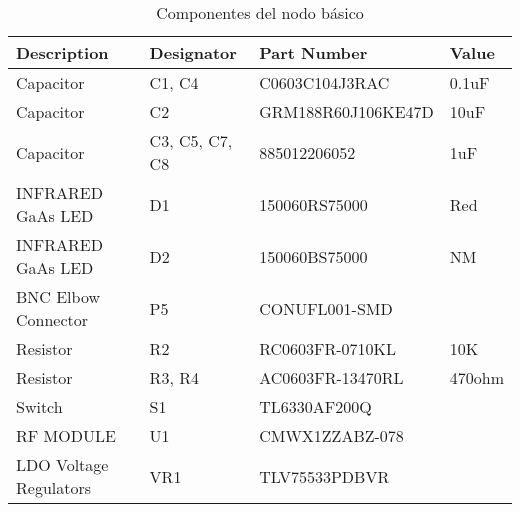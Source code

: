 	
\begin{table}[htb!]

\centering

\begin{tabular}{|l|l|l|l|}
\hline
Description            & Designator     & Part Number        & Value  \\ \hline
Capacitor              & C1, C4         & C0603C104J3RAC     & 0.1uF  \\ \hline
Capacitor              & C2             & GRM188R60J106KE47D & 10uF   \\ \hline
Capacitor              & C3, C5, C7, C8 & 885012206052       & 1uF    \\ \hline
INFRARED GaAs LED      & D1             & 150060RS75000      & Red    \\ \hline
INFRARED GaAs LED      & D2             & 150060BS75000      & NM     \\ \hline
BNC Elbow Connector    & P5             & CONUFL001-SMD      &        \\ \hline
Resistor               & R2             & RC0603FR-0710KL    & 10K    \\ \hline
Resistor               & R3, R4         & AC0603FR-13470RL   & 470ohm \\ \hline
Switch                 & S1             & TL6330AF200Q       &        \\ \hline
RF MODULE              & U1             & CMWX1ZZABZ-078     &        \\ \hline
LDO Voltage Regulators & VR1            & TLV75533PDBVR      &        \\ \hline
\end{tabular}
\caption{Componentes del nodo básico}
\label{tab:nodeBOM}

\end{table}


